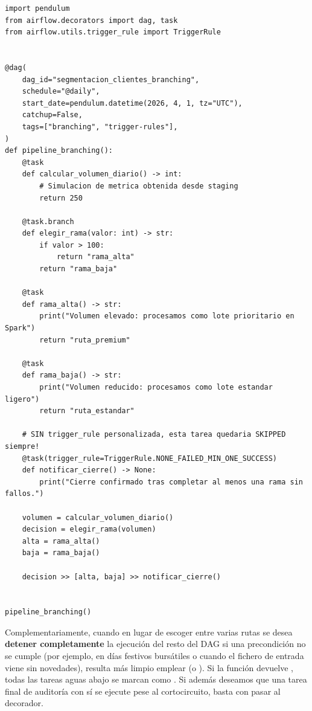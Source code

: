 \begin{lstlisting}[style=python, caption={Branching condicional con \code{@task.branch} y convergencia segura mediante \code{TriggerRule}.}, label={lst:branching-trigger-rules}]
import pendulum
from airflow.decorators import dag, task
from airflow.utils.trigger_rule import TriggerRule


@dag(
    dag_id="segmentacion_clientes_branching",
    schedule="@daily",
    start_date=pendulum.datetime(2026, 4, 1, tz="UTC"),
    catchup=False,
    tags=["branching", "trigger-rules"],
)
def pipeline_branching():
    @task
    def calcular_volumen_diario() -> int:
        # Simulacion de metrica obtenida desde staging
        return 250

    @task.branch
    def elegir_rama(valor: int) -> str:
        if valor > 100:
            return "rama_alta"
        return "rama_baja"

    @task
    def rama_alta() -> str:
        print("Volumen elevado: procesamos como lote prioritario en Spark")
        return "ruta_premium"

    @task
    def rama_baja() -> str:
        print("Volumen reducido: procesamos como lote estandar ligero")
        return "ruta_estandar"

    # SIN trigger_rule personalizada, esta tarea quedaria SKIPPED siempre!
    @task(trigger_rule=TriggerRule.NONE_FAILED_MIN_ONE_SUCCESS)
    def notificar_cierre() -> None:
        print("Cierre confirmado tras completar al menos una rama sin fallos.")

    volumen = calcular_volumen_diario()
    decision = elegir_rama(volumen)
    alta = rama_alta()
    baja = rama_baja()

    decision >> [alta, baja] >> notificar_cierre()


pipeline_branching()
\end{lstlisting}

Complementariamente, cuando en lugar de escoger entre varias rutas se desea \textbf{detener completamente} la ejecución del resto del DAG si una precondición no se cumple (por ejemplo, en días festivos bursátiles o cuando el fichero de entrada viene sin novedades), resulta más limpio emplear  (o ). Si la función devuelve , todas las tareas aguas abajo se marcan como . Si además deseamos que una tarea final de auditoría con  sí se ejecute pese al cortocircuito, basta con pasar  al decorador.

